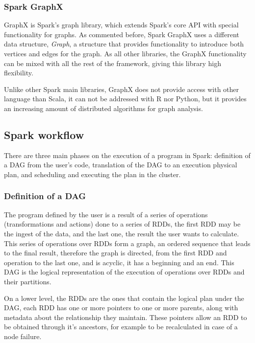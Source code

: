 \documentclass[11pt]{book} %
\begin{document}
        \subsubsection{Spark GraphX}

          GraphX is Spark's graph library, which extends Spark's core API with special functionality for graphs. As commented before, Spark GraphX uses a different data structure, \emph{Graph}, a structure that provides functionality to introduce both vertices and edges for the graph. As all other libraries, the GraphX functionality can be mixed with all the rest of the framework, giving this library high flexibility.

          Unlike other Spark main libraries, GraphX does not provide access with other language than Scala, it can not be addressed with R nor Python, but it provides an increasing amount of distributed algorithms for graph analysis.

      \subsection{Spark workflow}

        There are three main phases on the execution of a program in Spark: definition of a DAG from the user's code, translation of the DAG to an execution physical plan, and scheduling and executing the plan in the cluster.

        \subsubsection{Definition of a DAG}

          The program defined by the user is a result of a series of operations (transformations and actions) done to a series of RDDs, the first RDD may be the ingest of the data, and the last one, the result the user wants to calculate. This series of operations over RDDs form a graph, an ordered sequence that leads to the final result, therefore the graph is directed, from the first RDD and operation to the last one, and is acyclic, it has a beginning and an end. This DAG is the logical representation of the execution of operations over RDDs and their partitions.

          On a lower level, the RDDs are the ones that contain the logical plan under the DAG, each RDD has one or more pointers to one or more parents, along with metadata about the relationship they maintain. These pointers allow an RDD to be obtained through it's ancestors, for example to be recalculated in case of a node failure.
\end{document}
